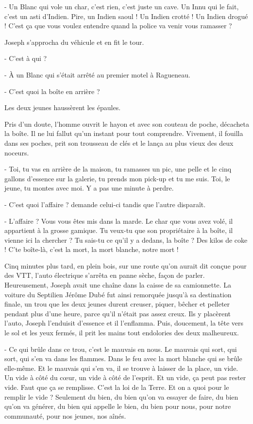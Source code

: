 - Un Blanc qui vole un char, c’est rien, c’est juste un cave. Un Innu qui le fait, c’est un asti d’Indien. Pire, un Indien saoul ! Un Indien crotté ! Un Indien drogué ! C’est ça que vous voulez entendre quand la police va venir vous ramasser ?

Joseph s’approcha du véhicule et en fit le tour.

- C’est à qui ?

- À un Blanc qui s’était arrêté au premier motel à Ragueneau.

- C’est quoi la boîte en arrière ?

Les deux jeunes haussèrent les épaules.

Pris d’un doute, l’homme ouvrit le hayon et avec son couteau de poche, décacheta la boîte. Il ne lui fallut qu’un instant pour tout comprendre. Vivement, il fouilla dans ses poches, prit son trousseau de clés et le lança au plus vieux des deux noceurs.

- Toi, tu vas en arrière de la maison, tu ramasses un pic, une pelle et le cinq gallons d’essence sur la galerie, tu prends mon pick-up et tu me suis. Toi, le jeune, tu montes avec moi. Y a pas une minute à perdre.

- C’est quoi l’affaire ? demande celui-ci tandis que l’autre disparaît.

- L’affaire ? Vous vous êtes mis dans la marde. Le char que vous avez volé, il appartient à la grosse gamique. Tu veux-tu que son propriétaire à la boîte, il vienne ici la chercher ? Tu sais-tu ce qu’il y a dedans, la boîte ? Des kilos de coke ! C’te boîte-là, c’est la mort, la mort blanche, notre mort !

Cinq minutes plus tard, en plein bois, sur une route qu’on aurait dit conçue pour des VTT, l’auto électrique s’arrêta en panne sèche, façon de parler. Heureusement, Joseph avait une chaîne dans la caisse de sa camionnette. La voiture du Septilien Jérôme Dubé fut ainsi remorquée jusqu’à sa destination finale, un trou que les deux jeunes durent creuser, piquer, bêcher et pelleter pendant plus d’une heure, parce qu’il n’était pas assez creux. Ils y placèrent l’auto, Joseph l’enduisit d’essence et il l’enflamma. Puis, doucement, la tête vers le sol et les yeux fermés, il prit les mains tout endolories des deux malheureux.

- Ce qui brûle dans ce trou, c’est le mauvais en nous. Le mauvais qui sort, qui sort, qui s’en va dans les flammes. Dans le feu avec la mort blanche qui se brûle elle-même. Et le mauvais qui s’en va, il se trouve à laisser de la place, un vide. Un vide à côté du cœur, un vide à côté de l’esprit. Et un vide, ça peut pas rester vide. Faut que ça se remplisse. C’est la loi de la Terre. Et on a quoi pour le remplir le vide ? Seulement du bien, du bien qu’on va essayer de faire, du bien qu’on va générer, du bien qui appelle le bien, du bien pour nous, pour notre communauté, pour nos jeunes, nos aînés.

